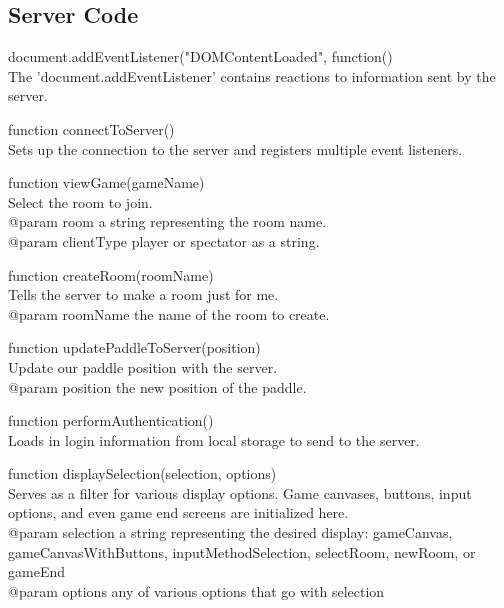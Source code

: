 \documentclass[12pt]{article}
\newenvironment{itemize*}%
  {\begin{itemize}%
  	\setlength{\parsep}{0pt}
    \setlength{\itemsep}{0pt}%
    \setlength{\parskip}{0pt}}%
  {\end{itemize}}
\begin{document}
\subsection{Server Code}
\begin{itemize*}
\item document.addEventListener("DOMContentLoaded", function()\\
The 'document.addEventListener' contains reactions to information sent by the server.
\item function connectToServer()\\
Sets up the connection to the server and registers multiple event listeners.
\item function viewGame(gameName)\\
Select the room to join.\\
@param room a string representing the room name.\\
@param clientType player or spectator as a string.
\item function createRoom(roomName)\\
Tells the server to make a room just for me.\\
@param {roomName} the name of the room to create.
\item function updatePaddleToServer(position)\\
Update our paddle position with the server.\\
@param {position} the new position of the paddle.
\item function performAuthentication()\\
Loads in login information from local storage to send to the server.
\item function displaySelection(selection, options)\\
Serves as a filter for various display options.  Game canvases, buttons, input options, and even game end screens are initialized here.\\
@param {selection} a string representing the desired display: gameCanvas, gameCanvasWithButtons, inputMethodSelection, selectRoom, newRoom, or gameEnd\\
@param {options} any of various options that go with {selection}\\
\end{itemize*}
\end{document}
